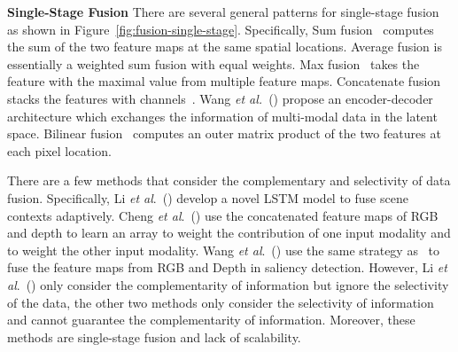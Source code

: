 \documentclass[10pt,twocolumn,letterpaper]{article}
\def\etal{\emph{et al}.}
\begin{document}
\noindent
\textbf{Single-Stage Fusion} There are several general patterns for single-stage fusion as shown in Figure~\ref{fig:fusion-single-stage}. Specifically, Sum fusion~\cite{li2019rgbd,hazirbas2016fusenet} computes the sum of the two feature maps at the same spatial locations.
Average fusion is essentially a weighted sum fusion with equal weights.
Max fusion~\cite{kang2014convolutional} takes the feature with the maximal value from multiple feature maps.
Concatenate fusion stacks the features with channels~\cite{couprie2013indoor,guo2018semantic}.
Wang \emph{et al.}~(\cite{wang2016learning}) propose an encoder-decoder architecture which exchanges the information of multi-modal data in the latent space.
Bilinear fusion~\cite{lin2015bilinear} computes an outer matrix product of the two features at each pixel location.

There are a few methods that consider the complementary and selectivity of data fusion.
Specifically, Li \etal~(\cite{li2016lstm-cf}) develop a novel LSTM model to fuse scene contexts adaptively.
Cheng \etal~(\cite{cheng2017locality}) use the concatenated feature maps of RGB and depth to learn an array  to weight the contribution of one input modality and  to weight the other input modality.
Wang \etal~(\cite{wang2019adaptive}) use the same strategy as~\cite{cheng2017locality} to fuse the feature maps from RGB and Depth in saliency detection.
However, Li \etal~(\cite{li2016lstm-cf}) only consider the complementarity of information but ignore the selectivity of the data, the other two methods only consider the selectivity of information and cannot guarantee the complementarity of information.
Moreover, these methods are single-stage fusion and lack of scalability.
\end{document}
